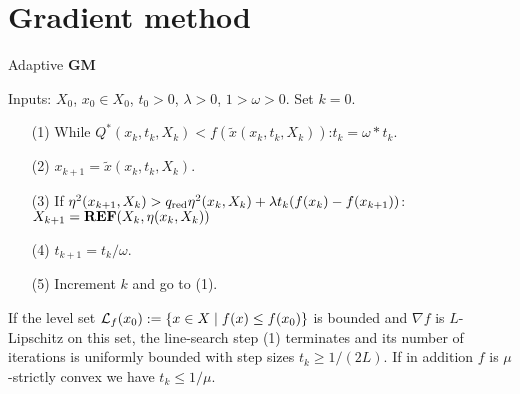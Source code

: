
%
\section{Gradient method}\label{sec:}
%
%
\begin{yellow}
\begin{algorithm}[H]
\caption{Adaptive \textbf{GM}} 
\label{algorithm:adaptiveGM} 
%
Inputs: $X_0$, $x_0\in X_0$, $t_0>0$, $\lambda>0$, $1>\omega>0$. Set $k=0$.
%
\begin{itemize}
\item[(1)] While $Q^*(x_k, t_k, X_{k})< f(\widetilde{x}(x_k,t_k, X_{k}))$:\quad $t_k = \omega*t_k$.
\item[(2)] $x_{k+1} = \widetilde{x}(x_k,t_k,X_{k})$.
\item[(3)] If $\eta^2(x_{k+1}, X_{k})> q_{\rm red}\eta^2(x_{k}, X_{k}) + \lambda t_{k}(f(x_{k})-f(x_{k+1}))$:\quad $X_{k+1}={\mbox{\textbf{REF}}}(X_{k}, \eta(x_k,X_k))$\\
\item[(4)] $t_{k+1} = t_k/\omega$.
\item[(5)] Increment $k$ and go to (1).
\end{itemize}
%
\end{algorithm}
\end{yellow}
% 
\begin{lemma}\label{lemma:}
If the level set $\mathcal L_f(x_0):=\left\{x\in X\;\middle|\;f(x)\le f(x_0)\right\}$ is bounded and $\nabla f$ is $L$-Lipschitz on this set, the line-search step (1) terminates and its number of iterations is uniformly bounded with step sizes $t_k\ge 1/(2L)$. 
If in addition $f$ is $\mu$-strictly convex we have $t_k\le 1/\mu$.
\end{lemma}
%
